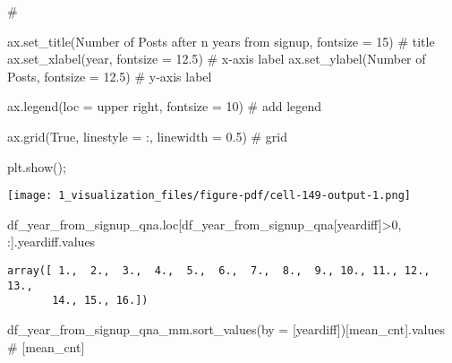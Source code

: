 \documentclass[
  letterpaper,
  DIV=11,
  numbers=noendperiod]{scrartcl}
\newenvironment{Shaded}{\begin{snugshade}}{\end{snugshade}}
\newcommand{\CommentTok}[1]{\textcolor[rgb]{0.37,0.37,0.37}{#1}}
\newcommand{\DecValTok}[1]{\textcolor[rgb]{0.68,0.00,0.00}{#1}}
\newcommand{\FloatTok}[1]{\textcolor[rgb]{0.68,0.00,0.00}{#1}}
\newcommand{\NormalTok}[1]{\textcolor[rgb]{0.00,0.23,0.31}{#1}}
\newcommand{\OperatorTok}[1]{\textcolor[rgb]{0.37,0.37,0.37}{#1}}
\newcommand{\StringTok}[1]{\textcolor[rgb]{0.13,0.47,0.30}{#1}}
\newcommand{\VariableTok}[1]{\textcolor[rgb]{0.07,0.07,0.07}{#1}}
\begin{document}
\begin{Shaded}
\begin{Highlighting}[]
\CommentTok{\# }

\NormalTok{ax.set\_title(}\StringTok{\textquotesingle{}Number of Posts after n years from signup\textquotesingle{}}\NormalTok{, fontsize }\OperatorTok{=} \DecValTok{15}\NormalTok{) }\CommentTok{\# title}
\NormalTok{ax.set\_xlabel(}\StringTok{\textquotesingle{}year\textquotesingle{}}\NormalTok{, fontsize }\OperatorTok{=} \FloatTok{12.5}\NormalTok{) }\CommentTok{\# x{-}axis label}
\NormalTok{ax.set\_ylabel(}\StringTok{\textquotesingle{}Number of Posts\textquotesingle{}}\NormalTok{, fontsize }\OperatorTok{=} \FloatTok{12.5}\NormalTok{) }\CommentTok{\# y{-}axis label}

\NormalTok{ax.legend(loc }\OperatorTok{=} \StringTok{\textquotesingle{}upper right\textquotesingle{}}\NormalTok{, fontsize }\OperatorTok{=} \DecValTok{10}\NormalTok{) }\CommentTok{\# add legend}

\NormalTok{ax.grid(}\VariableTok{True}\NormalTok{, linestyle }\OperatorTok{=} \StringTok{\textquotesingle{}:\textquotesingle{}}\NormalTok{, linewidth }\OperatorTok{=} \FloatTok{0.5}\NormalTok{) }\CommentTok{\# grid}

\NormalTok{plt.show()}\OperatorTok{;}
\end{Highlighting}
\end{Shaded}

\texttt{[image: 1\_visualization\_files/figure-pdf/cell-149-output-1.png]}

\begin{Shaded}
\begin{Highlighting}[]
\NormalTok{df\_year\_from\_signup\_qna.loc[df\_year\_from\_signup\_qna[}\StringTok{\textquotesingle{}yeardiff\textquotesingle{}}\NormalTok{]}\OperatorTok{\textgreater{}}\DecValTok{0}\NormalTok{, :].yeardiff.values}
\end{Highlighting}
\end{Shaded}

\begin{verbatim}
array([ 1.,  2.,  3.,  4.,  5.,  6.,  7.,  8.,  9., 10., 11., 12., 13.,
       14., 15., 16.])
\end{verbatim}

\begin{Shaded}
\begin{Highlighting}[]
\NormalTok{df\_year\_from\_signup\_qna\_mm.sort\_values(by }\OperatorTok{=}\NormalTok{ [}\StringTok{\textquotesingle{}yeardiff\textquotesingle{}}\NormalTok{])[}\StringTok{\textquotesingle{}mean\_cnt\textquotesingle{}}\NormalTok{].values}
\CommentTok{\# [\textquotesingle{}mean\_cnt\textquotesingle{}]}
\end{Highlighting}
\end{Shaded}
\end{document}
